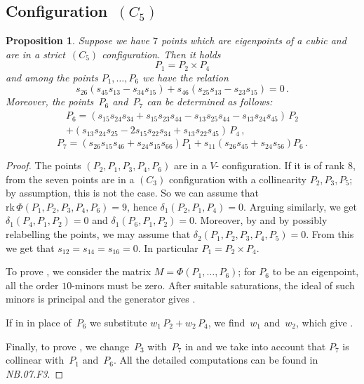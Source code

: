 \documentclass[a4paper, 11pt, reqno]{amsart}
\theoremstyle{plain}
\newtheorem{prop}[lemma]{Proposition}
\theoremstyle{definition}
\newcommand{\nb}[2]{\textsl{{NB}.{#1}.{#2}}}
\newcommand{\rk}{\ensuremath{\mathrm{rk}}}
\begin{document}
\subsection*{Configuration~\texorpdfstring{$(C_5)$}{C5}}
\begin{prop}
\label{proposition:condition_5}
Suppose we have $7$ points which are eigenpoints of a cubic and are in a strict~$(C_5)$ configuration.
Then it holds
%
\[
  P_1 = P_2 \times P_4
\]
%
and among the points $P_1, \dots, P_6$ we have the relation
%
\begin{equation}
\label{eq:condition_C5}
  s_{26}(s_{45}s_{13}-s_{34}s_{15})+s_{46}(s_{25}s_{13}-s_{23}s_{15}) = 0 \,.
\end{equation}
%
Moreover, the points~$P_6$ and~$P_7$ can be determined as follows:
%
\begin{equation}
\label{eq:p6formula}
\begin{multlined}
  P_6 = (s_{15}s_{24}s_{34}+s_{15}s_{23}s_{44} -s_{13}s_{25}s_{44} -s_{13}s_{24}s_{45}) \, P_2 \\ + (s_{13}s_{24}s_{25}-2s_{15}s_{22}s_{34}+s_{13}s_{22}s_{45}) \, P_4 \,,
\end{multlined}
\end{equation}
%
\begin{equation}
\label{eq:p7formula}
P_7 = (s_{26}s_{15}s_{46}+s_{24}s_{15}s_{66})P_1 + s_{11}(s_{26}s_{45}+s_{24}s_{56})P_6\,.
\end{equation}
%
\end{prop}
\begin{proof}
The points $(P_2, P_1, P_3, P_4, P_6)$ are in a
$V$- configuration. If it is of rank $8$,
from  the seven points are in a $(C_3)$ configuration
with a collinearity $P_2, P_3,P_5$; by assumption, this is not the case. So
we can assume that $\rk \, \Phi(P_1, P_2, P_3, P_4, P_6) = 9$, hence $\delta_1(P_2, P_1, P_4)=0$.
Arguing similarly, we get $\delta_1(P_4, P_1, P_2) = 0$ and $\delta_1(P_6, P_1, P_2) = 0$. Moreover, by  and by possibly relabelling the points, we may assume that $\delta_2(P_1, P_2, P_3, P_4, P_5)=0$. From this we get that
$s_{12} = s_{14}=s_{16}=0$. In particular $P_1 = P_2 \times P_4$.

To prove ,
we consider the matrix $M = \Phi(P_1, \dots, P_6)$;
for $P_6$ to be an eigenpoint,
all the order $10$-minors must be zero.
After suitable saturations, the ideal of such minors is principal and the generator gives .

If in  in place of~$P_6$ we substitute $w_1 \, P_2 + w_2 \, P_4$,
we find~$w_1$ and~$w_2$, which give .

Finally, to prove , we change~$P_3$ with~$P_7$ in  and we take into account that $P_7$ is collinear with~$P_1$ and~$P_6$. All the detailed computations can be found in \nb{07}{F3}.
\end{proof}
\end{document}
